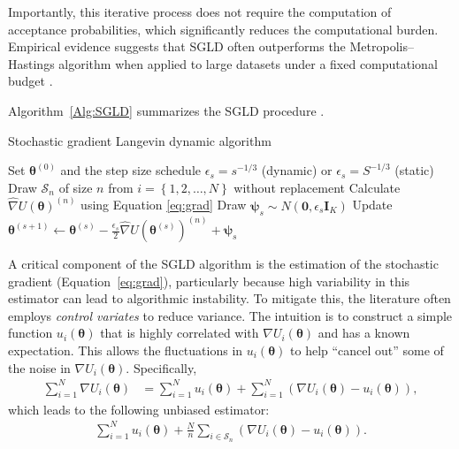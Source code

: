 Importantly, this iterative process does not require the computation of acceptance probabilities, which significantly reduces the computational burden. Empirical evidence suggests that SGLD often outperforms the Metropolis–Hastings algorithm when applied to large datasets under a fixed computational budget \cite{li2016scalable}.

Algorithm~\ref{Alg:SGLD} summarizes the SGLD procedure \cite{nemeth2021stochastic}. 

\begin{algorithm}[h!]
	\caption{Stochastic gradient Langevin dynamic algorithm}\label{Alg:SGLD}
	\begin{algorithmic}[1]
		\State Set $\bm{\theta}^{(0)}$ and the step size schedule $\epsilon_s=s^{-1/3}$ (dynamic) or $\epsilon_s=S^{-1/3}$ (static)  		 			
		\State Draw $\mathcal{S}_n$ of size $n$ from $i=\left\{1,2,\dots,N\right\}$ without replacement
		\State Calculate $\hat{\nabla} U(\boldsymbol{\theta})^{(n)}$ using Equation \ref{eq:grad}  
		\State Draw $\boldsymbol{\psi}_s\sim N(\mathbf{0},\epsilon_s\mathbf{I}_K)$
		\State Update $\boldsymbol{\theta}^{(s+1)}\leftarrow \boldsymbol{\theta}^{(s)} -\frac{\epsilon_s}{2}\hat{\nabla} U(\boldsymbol{\theta}^{(s)})^{(n)}+\boldsymbol{\psi}_s$
		\EndFor 
	\end{algorithmic} 
\end{algorithm}
 
A critical component of the SGLD algorithm is the estimation of the stochastic gradient (Equation~\ref{eq:grad}), particularly because high variability in this estimator can lead to algorithmic instability. To mitigate this, the literature often employs \emph{control variates} to reduce variance. The intuition is to construct a simple function \( u_i(\boldsymbol{\theta}) \) that is highly correlated with \( \nabla U_i(\boldsymbol{\theta}) \) and has a known expectation. This allows the fluctuations in \( u_i(\boldsymbol{\theta}) \) to help ``cancel out'' some of the noise in \( \nabla U_i(\boldsymbol{\theta}) \). Specifically,
\begin{align*}
	\sum_{i=1}^N \nabla U_i(\boldsymbol{\theta}) &= \sum_{i=1}^N u_i(\boldsymbol{\theta}) + \sum_{i=1}^N \left( \nabla U_i(\boldsymbol{\theta}) - u_i(\boldsymbol{\theta}) \right),
\end{align*}
which leads to the following unbiased estimator:
\begin{align*}
	\sum_{i=1}^N u_i(\boldsymbol{\theta}) + \frac{N}{n} \sum_{i \in \mathcal{S}_n} \left( \nabla U_i(\boldsymbol{\theta}) - u_i(\boldsymbol{\theta}) \right).
\end{align*}

